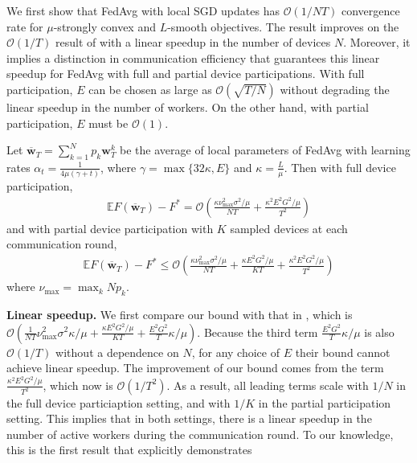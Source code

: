 We first show that FedAvg with local SGD updates has $\mathcal{O}(1/NT)$
convergence rate for $\mu$-strongly convex and $L$-smooth objectives.
The result improves on the $\mathcal{O}(1/T)$ result of \cite{li2019convergence}
with a linear speedup in the number of devices $N$. Moreover, it
implies a distinction in communication efficiency that guarantees
this linear speedup for FedAvg with full and partial device participations.
With full participation, $E$ can be chosen as large as $\mathcal{O}(\sqrt{T/N})$
without degrading the linear speedup in the number of workers. On
the other hand, with partial participation, $E$ must be $\mathcal{O}(1)$. 
\begin{theorem}
	\label{thm:SGD_scvx}Let $\overline{\mathbf{w}}_{T}=\sum_{k=1}^{N}p_{k}\mathbf{w}_{T}^{k}$
	be the average of local parameters of FedAvg with learning rates $\alpha_{t}=\frac{1}{4\mu(\gamma+t)}$,
	where $\gamma=\max\{32\kappa,E\}$ and $\kappa=\frac{L}{\mu}$. Then
	with full device participation, 
	\begin{align*}
	\mathbb{E}F(\overline{\mathbf{w}}_{T})-F^{\ast}=\mathcal{O}\left(\frac{\kappa\nu_{\max}^{2}\sigma^{2}/\mu}{NT}+\frac{\kappa^{2}E^{2}G^{2}/\mu}{T^{2}}\right)
	\end{align*}
	and with partial device participation with $K$ sampled devices at
	each communication round, 
	\begin{align*}
	\mathbb{E}F(\overline{\mathbf{w}}_{T})-F^{\ast}\leq\mathcal{O}\left(\frac{\kappa\nu_{\max}^{2}\sigma^{2}/\mu}{NT}+\frac{\kappa E^{2}G^{2}/\mu}{KT}+\frac{\kappa^{2}E^{2}G^{2}/\mu}{T^{2}}\right)
	\end{align*}
	where $\nu_{\max}=\max_{k}Np_{k}$.
\end{theorem}
%
\textbf{Linear speedup. }We first compare our bound with that in \cite{li2019convergence},
which is $\mathcal{O}(\frac{1}{NT}\nu_{\max}^{2}\sigma^{2}\kappa/\mu+\frac{\kappa E^{2}G^{2}/\mu}{KT}+\frac{E^{2}G^{2}}{T}\kappa/\mu)$.
Because the third term $\frac{E^{2}G^{2}}{T}\kappa/\mu$ is also $\mathcal{O}(1/T)$
without a dependence on $N$, for any choice of $E$ their bound cannot
achieve linear speedup. The improvement of our bound comes from the
term $\frac{\kappa^{2}E^{2}G^{2}/\mu}{T^{2}}$, which now is $\mathcal{O}(1/T^{2})$.
As a result, all leading terms scale with $1/N$ in the full device
particiaption setting, and with $1/K$ in the partial participation
setting. This implies that in both settings, there is a linear speedup
in the number of active workers during the communication round. To
our knowledge, this is the first result that explicitly demonstrates
